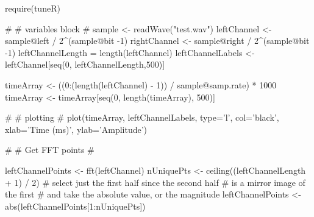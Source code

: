 require(tuneR)

#
# variables block
#
sample <- readWave("test.wav")
leftChannel <- sample@left / 2^(sample@bit -1)
rightChannel <- sample@right / 2^(sample@bit -1)
leftChannelLength = length(leftChannel)
leftChannelLabels <- leftChannel[seq(0, leftChannelLength,500)]

timeArray <- ((0:(length(leftChannel) - 1)) / sample@samp.rate) * 1000
timeArray <- timeArray[seq(0, length(timeArray), 500)]

#
# plotting
#
plot(timeArray, leftChannelLabels, type='l', col='black', xlab='Time (ms)', ylab='Amplitude')

#
# Get FFT points
#

leftChannelPoints <- fft(leftChannel)
nUniquePts <- ceiling((leftChannelLength + 1) / 2)
# select just the first half since the second half 
# is a mirror image of the first
# and take the absolute value, or the magnitude 
leftChannelPoints <- abs(leftChannelPoints[1:nUniquePts])
